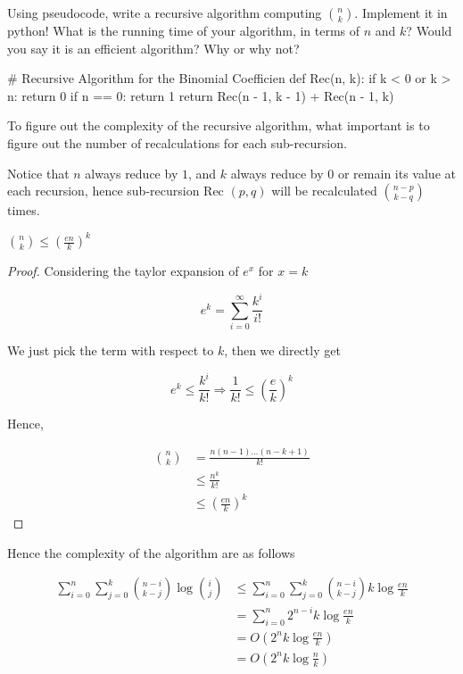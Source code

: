 \documentclass[11pt,a4paper,oneside]{article}
\begin{document}
\begin{problem}{3} 
        Using pseudocode, write a recursive algorithm computing
        ${n \choose k}$. Implement it in python! What is 
        the running time of your algorithm, in terms of $n$ and $k$? Would you say it is an efficient
        algorithm? Why or why not?
    \solution
\begin{python}
# Recursive Algorithm for the Binomial Coefficien
def Rec(n, k):
    if k < 0 or k > n:
        return 0
    if n == 0:
	    return 1
    return Rec(n - 1, k - 1) + Rec(n - 1, k)
\end{python}
    
    To figure out the complexity of the recursive algorithm, what important is to figure out the number of recalculations for each sub-recursion.
    
    Notice that \( n \) always reduce by \( 1 \), and \( k \) always reduce by \(0\) or remain its value at each recursion, hence sub-recursion Rec \( (p, q) \) will be recalculated \( {n - p \choose k - q} \) times.
    
	\begin{lemma}
		\({n \choose k} \leq (\frac{en}{k})^k\)
	\begin{proof}
		Considering the taylor expansion of \(e^x\) for \(x = k\)
		
		\[
			e^k = \sum_{i=0}^{\infty} \frac{k^i}{i!}
		\]
		
		We just pick the term with respect to \(k\), then we directly get 
		
		\[
			e^k \leq \frac{k^i}{k!} \Rightarrow \frac{1}{k!} \leq (\frac{e}{k})^k
		\]
		
		Hence,
		
		\[
			\begin{split}
				{n \choose k} &= \frac{n(n-1)\dots(n-k+1)}{k!} \\
				&\leq \frac{n^k}{k!} \\
				&\leq (\frac{en}{k})^k
			\end{split}
		\]
		
    \end{proof}
    \end{lemma}
    Hence the complexity of the algorithm are as follows

    \[
	    \begin{split}
		    \sum_{i = 0}^{n} \sum_{j = 0}^{k} {n - i \choose k - j} \log{i \choose j}  &\leq \sum_{i = 0}^{n} \sum_{j = 0}^{k}  {n - i \choose k - j} k\log{\frac{en}{k}} \\
		    &= \sum_{i=0}^n 2^{n-i} k \log{\frac{en}{k}} \\
		    &= O(2^{n}k \log{\frac{en}{k}}) \\
		    &= O(2^{n}k \log{\frac{n}{k}})
	    \end{split}
	\]
	

\end{problem}
\end{document}
